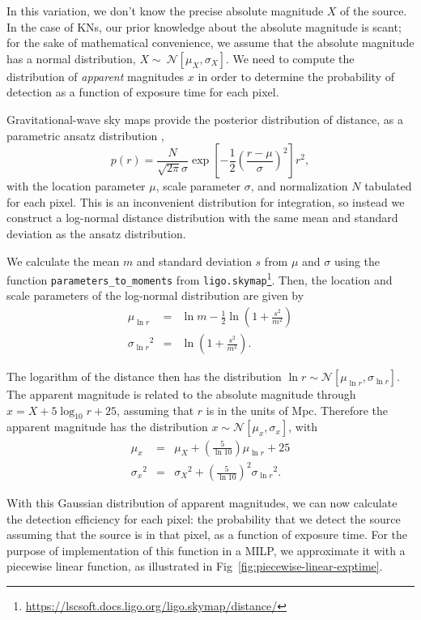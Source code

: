 \documentclass[twocolumn,times]{aastex631}
\begin{document}
In this variation, we don't know the precise absolute magnitude $X$ of the source. In the case of \acp{KN}, our prior knowledge about the absolute magnitude is scant; for the sake of mathematical convenience, we assume that the absolute magnitude has a normal distribution, $X \sim~ \mathcal{N}[\mu_X, \sigma_X]$. We need to compute the distribution of \textit{apparent} magnitudes $x$ in order to determine the probability of detection as a function of exposure time for each pixel.

Gravitational-wave sky maps provide the posterior distribution of distance, as a parametric ansatz distribution \citep{2016ApJ...829L..15S,2016ApJS..226...10S},
%
$$
    p(r) = \frac{N}{\sqrt{2 \pi}\sigma} \exp\left[-\frac{1}{2}\left(\frac{r - \mu}{\sigma}\right)^2\right] r^2,
$$
%
with the location parameter $\mu$, scale parameter $\sigma$, and normalization $N$ tabulated for each pixel. This is an inconvenient distribution for integration, so instead we construct a log-normal distance distribution with the same mean and standard deviation as the ansatz distribution.

We calculate the mean $m$ and standard deviation $s$ from $\mu$ and $\sigma$ using the function \texttt{parameters\_to\_moments} from \texttt{ligo.skymap}\footnote{\url{https://lscsoft.docs.ligo.org/ligo.skymap/distance/}}. Then, the location and scale parameters of the log-normal distribution are given by
%
\begin{eqnarray}
    \label{eq:log-distance-parameters}
    \mu_{\ln r} &=& \ln m - \frac{1}{2} \ln \left(1 + \frac{s^2}{m^2}\right) \\
    {\sigma_{\ln r}}^2 &=& \ln \left(1 + \frac{s^2}{m^2}\right).
\end{eqnarray}

The logarithm of the distance then has the distribution $\ln r \sim \mathcal{N}[\mu_{\ln r}, \sigma_{\ln r}]$. The apparent magnitude is related to the absolute magnitude through $x = X + 5 \log_{10} r + 25$, assuming that $r$ is in the units of Mpc. Therefore the apparent magnitude has the distribution $x \sim \mathcal{N}[\mu_x, \sigma_x]$, with
%
\begin{eqnarray}
    \label{eq:appmag-parameters}
    \mu_x &=& \mu_X + \left(\frac{5}{\ln 10}\right) \mu_{\ln r} + 25 \\
    {\sigma_x}^2 &=& {\sigma_{X}}^2 + \left(\frac{5}{\ln 10}\right)^2 {\sigma_{\ln r}}^2.
\end{eqnarray}

With this Gaussian distribution of apparent magnitudes, we can now calculate the detection efficiency for each pixel: the probability that we detect the source assuming that the source is in that pixel, as a function of exposure time. For the purpose of implementation of this function in a \ac{MILP}, we approximate it with a piecewise linear function, as illustrated in Fig~\ref{fig:piecewise-linear-exptime}.
\end{document}
